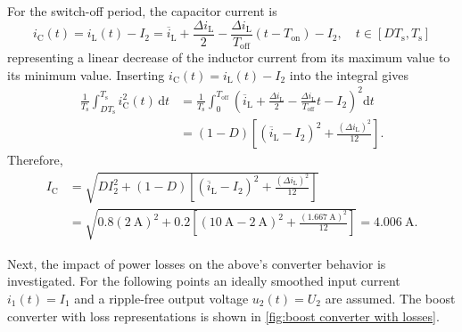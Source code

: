 \begin{solutionblock}
\begin{equation}
	\end{equation}
	For the switch-off period, the capacitor current is
	\begin{equation}
		i_\mathrm{C}(t)= i_\mathrm{L}(t) - I_2 = \overline{i}_\mathrm{L} + \frac{\Delta i_\mathrm{L}}{2} -\frac{\Delta i_\mathrm{L}}{T_\mathrm{off}}(t-T_\mathrm{on})- I_2, \quad t \in [DT_\mathrm{s},T_\mathrm{s}]
	\end{equation}
	representing a linear decrease of the inductor current from its maximum value to its minimum value. Inserting $i_\mathrm{C}(t)=i_\mathrm{L}(t) - I_\mathrm{2}$ into the integral gives
	\begin{equation}
		\begin{aligned}
			\frac{1}{T_\mathrm{s}}\int_{DT_\mathrm{s}}^{T_\mathrm{s}}i_\mathrm{C}^2(t)\,\mathrm{d}t
			 & =\frac{1}{T_\mathrm{s}}\int_{0}^{T_\mathrm{off}}
			\left(\overline{i}_\mathrm{L} + \frac{\Delta i_\mathrm{L}}{2} -\frac{\Delta i_\mathrm{L}}{T_\mathrm{off}}t- I_2\right)^2\mathrm{d}t \\
			 & =(1-D)\left[\left(\overline{i}_\mathrm{L}-I_\mathrm{2}\right)^2
				         +\frac{(\Delta i_\mathrm{L})^2}{12}\right].
		\end{aligned}
	\end{equation}
	Therefore,
	\begin{equation}
		\begin{aligned}
			I_\mathrm{C}
			 & =\sqrt{D I_\mathrm{2}^2+(1-D)\left[\left(\overline{i}_\mathrm{L}-I_\mathrm{2}\right)^2
					    +\frac{(\Delta i_\mathrm{L})^2}{12}\right]} \\
			 & =\sqrt{0.8(\SI{2}{\ampere})^2+0.2\left[
					    (\SI{10}{\ampere}-\SI{2}{\ampere})^2+
					    \frac{(\SI{1.667}{\ampere})^2}{12}\right]}
			=\SI{4.006}{\ampere}.
		\end{aligned}
	\end{equation}
\end{solutionblock}

Next, the impact of power losses on the above's converter behavior is investigated. For the following points an ideally smoothed input current $i_1(t)=I_1$ and a ripple-free output voltage $u_2(t)=U_2$ are assumed. The boost converter with loss representations is shown in \autoref{fig:boost converter with losses}.



